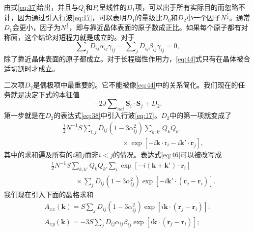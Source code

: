 \documentclass{article}
\begin{document}
由式\eqref{eq:37}给出，并且与$Q_i$和$P_i$呈线性的$D_1$项，可以出于所有实际目的而忽略不计，因为通过引入行波\eqref{eq:17}，可以表明$D_1$的量级比$D_0$和$D_2$小一个因子$N^\frac{1}{2}$。通常$D_1$会更小，因子为$N^\frac{1}{3}$，即与靠近晶体表面的原子数成正比。如果每个原子都有对称面，这个结论对短程力就是成立的。对于
\begin{equation} \label{eq:44}
\sum\nolimits_jD_{ij}\alpha_{ij}\gamma_{ij}=\sum\nolimits_jD_{ij}\beta_{ij}\gamma_{ij}=0,
\end{equation}
除了靠近晶体表面的原子都成立。对于长程磁性作用力，\eqref{eq:44}式只有在晶体被合适切割时才成立。

二次项$D_2$是偶极项中最重要的。它不能被像\eqref{eq:44}中的关系简化。我们现在的任务就是决定下式的本征值
\begin{equation} \label{eq:45}
-2J\sum\nolimits_{\mathit{nei}}\mathbf{S}_i\cdot\mathbf{S}_j+D_2.
\end{equation}
第一步就是在$D_2$的表达式\eqref{eq:38}中引入行波\eqref{eq:17}。$D_2$中的第一项就变成了
\begin{eqnarray} \label{eq:46}
&&\tfrac{1}{2}N^{-1}S\sum\nolimits_{i,j}D_{ij}(1-3\alpha_{ij}^2)\sum\nolimits_{k,k'}Q_kQ_{k'}\nonumber\\
&&\phantom{~~~~~~~~~~~~~~~~~~~~~~~~~~~~~~~~~~~~~~~}\times\exp[-i\mathbf{k}\cdot\mathrm{r}_i-i\mathbf{k}'\cdot\mathbf{r}_j],
\end{eqnarray}
其中的求和遍及所有的$i$和$j$而非$i<j$的情况。表达式\eqref{eq:46}可以被改写成
\begin{eqnarray} \label{eq:47}
&&\tfrac{1}{2}N^{-1}S\sum\nolimits_{k,k'}Q_kQ_{k'}\sum\nolimits_{i}\exp[-i(\mathbf{k}+\mathbf{k}')\cdot\mathbf{r}_i]\nonumber\\
&&\phantom{~~~~~~~~~~~~~~~~}\times\sum\nolimits_jD_{ij}(1-3\alpha_{ij}^2)\exp[-i\mathbf{k}'\cdot(\mathbf{r}_j-\mathbf{r}_i)].
\end{eqnarray}
我们现在引入下面的晶格求和
\begin{equation} \label{eq:48}
\begin{array}{l}
A_{xx}(\mathbf{k})=S\sum\nolimits_jD_{ij}(1-3\alpha_{ij}^2)\exp[i\mathbf{k}\cdot(\mathbf{r}_j-\mathbf{r}_i)];\\
A_{xy}(\mathbf{k})=-3S\sum\nolimits_jD_{ij}\alpha_{ij}\beta_{ij}\exp[i\mathbf{k}\cdot(\mathbf{r}_j-\mathbf{r}_i)];
\end{array}
\end{equation}
\end{document}
